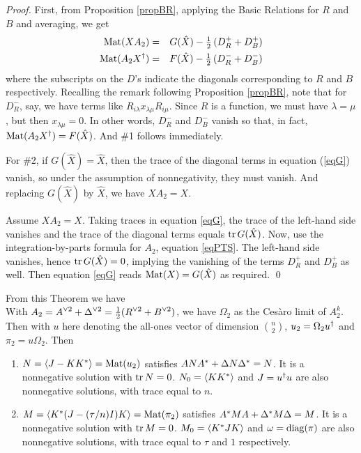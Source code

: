 \begin{proof}
First, from Proposition \ref{propBR}, applying the Basic Relations for $R$ and $B$ and averaging, we get
%
\begin{eqnarray}
\Mat(XA_2)  &=& G(\hat X)-\half\,(D_R^++D_B^+) \label{eqG}\\
\Mat(A_2\dg  X.)  &=&  F(\hat X)-\half\,(D_R^-+D_B^-)
\end{eqnarray}
%
where the subscripts on the $D$'s indicate the diagonals corresponding to $R$ and $B$ respectively.
Recalling the remark following Proposition \ref{propBR}, note that for $D_R^-$, say, we have terms like
$R_{i\lambda}x_{\lambda\mu}R_{i\mu}$. Since $R$ is a function, we must have $\lambda=\mu$, but then $x_{\lambda\mu}=0$.
In other words, $D_R^-$ and $D_B^-$ vanish so that, in fact,  $\Mat(A_2\dg  X.)  =  F(\hat X)$. And \#1 follows immediately.

For \#2,  if $G(\hat X)=\hat X$, then the trace of the diagonal terms in equation (\ref{eqG}) vanish, so under the assumption of
nonnegativity, they must vanish. And replacing $G(\hat X)$ by $\hat X$, we have $XA_2=X$.

Assume $XA_2=X$. Taking traces in equation \eqref{eqG}, the trace of the left-hand side vanishes and the trace of the diagonal
terms equals ${\rm tr}\, G(\hat X)$.  Now, use the integration-by-parts formula for $A_2$, equation \eqref{eqPTS}. The left-hand
side vanishes, hence ${\rm tr}\, G(\hat X)=0$, implying the vanishing of the terms $D_R^+$ and $D_B^+$ as well. Then equation
\eqref{eqG} reads ${\rm Mat}(X)=G(\hat X)$ as required. \qed
\end{proof}

From this Theorem we have \\

With $\displaystyle A_2={A}^{\vee 2}+{\Delta}^{\vee 2}=\tfrac{1}{2}({R}^{\vee 2}+{B}^{\vee 2})$, 
we have $\Omega_2$ as the Ces\`aro limit of $A_2^k$.
Then with $u$ here denoting the all-ones vector of dimension $\binom{n}{2}$,
$u_2=\Omega_2\dg  u.$ and $\pi_2=u\Omega_2$. Then
\begin{enumerate}
\item[{\normalfont 1.}] $N=\avg J-KK^*.=\Mat(u_2)$ satisfies ${A}{N}{A}^*+{\Delta}{N}{\Delta}^*=N$. It is a nonnegative solution with ${\rm tr}\, N=0$.
$N_0=\avg KK^*.$ and $J=\dg  u.u$ are also nonnegative solutions, with trace equal to $n$.\\

\item[{\normalfont 2.}] $M=\avg K^*(J-(\tau/n) I)K. =\Mat(\pi_2)$ satisfies ${A}^*{M}{A}+{\Delta}^*{M}{\Delta}=M$. It is a nonnegative solution with ${\rm tr}\, M=0$.
$M_0=\avg K^*JK.$ and $\omega={\rm diag}({\pi})$ are also nonnegative solutions, with trace equal to $\tau$ and $1$ respectively.
\end{enumerate}

